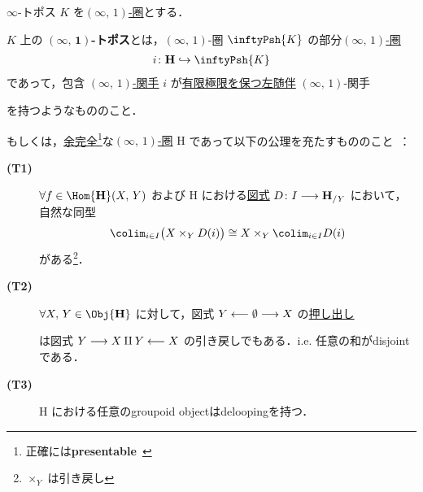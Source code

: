 \documentclass[TQFT_main]{subfiles}
\begin{document}
\begin{mydef}[label=def:infinity-topos]{$\infty$-トポス}
    $K$ を\hyperref[def:infinity-1]{$(\infty,\, 1)$-圏}とする．
    
    $K$ 上の $\bm{(\infty,\, 1)}$\textbf{-トポス}とは，$(\infty,\, 1)$-圏 $\inftyPsh{K}$ の部分\hyperref[def:infinity-1]{$(\infty,\, 1)$-圏}
    \begin{align}
        i \colon \bm{\mathrm{H}} \hookrightarrow \inftyPsh{K}
    \end{align}
    であって，包含 \hyperref[def:infinity-1]{$(\infty,\, 1)$-関手} $i$ が\hyperref[def:colim]{有限極限を保つ}\hyperref[def:adjoint]{左随伴} $(\infty,\, 1)$-関手
    \begin{center}
    \end{center}
    を持つようなもののこと．

    \tcblower

    もしくは，\hyperref[def:complete]{余完全}\footnote{正確には\textbf{presentable}~\cite[p.372, Def5.5.0.18]{lurie2008higher}}な\hyperref[def:infinity-1]{$(\infty,\, 1)$-圏} $\bm{\mathrm{H}}$ であって以下の公理を充たすもののこと~\cite[p.9, Definition5.4]{NSS2012}：
    \begin{description}
        \item[\textbf{(T1)}] $\forall f \in \Hom{\bm{\mathrm{H}}}(X,\, Y)$ および $\bm{\mathrm{H}}$ における\hyperref[def:diagram]{図式} $D \colon I \longrightarrow \bm{\mathrm{H}}_{/Y}$ において，自然な同型
        \begin{align}
            \colim_{i \in I} \bigl( X \times_Y D(i) \bigr) \cong X \times_Y \colim_{i \in I} D(i)
        \end{align}
        がある\footnote{$\times_Y$ は引き戻し}．
        \item[\textbf{(T2)}] $\forall X,\, Y \in \Obj{\bm{\mathrm{H}}}$ に対して，図式 $Y \longleftarrow \emptyset \longrightarrow X$ の\hyperref[def:colim]{押し出し}
        \begin{center}
        \end{center}
        は図式 $Y \longrightarrow X \amalg Y \longleftarrow X$ の引き戻しでもある．i.e. 任意の和がdisjointである．
        \item[\textbf{(T3)}] $\bm{\mathrm{H}}$ における任意のgroupoid objectはdeloopingを持つ．
    \end{description}
    
\end{mydef}
\end{document}
